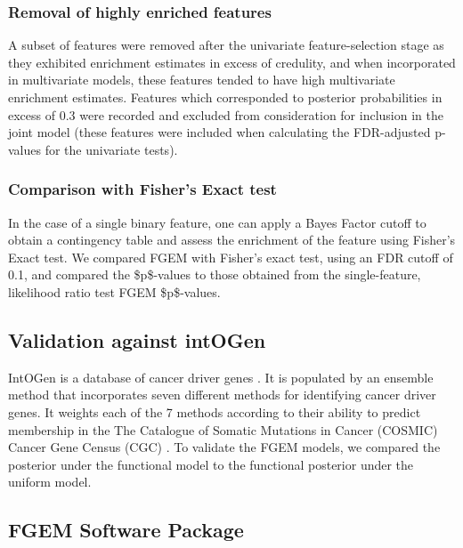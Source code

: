 \subsubsection{Removal of highly enriched features}\label{sec:org02cff25}

    A subset of features were removed after the univariate feature-selection stage as they exhibited enrichment estimates in excess of credulity, and when incorporated in multivariate models, these features tended to have high multivariate enrichment estimates. Features which corresponded to posterior probabilities in excess of 0.3 were recorded and excluded from consideration for inclusion in the joint model (these features were included when calculating the FDR-adjusted p-values for the univariate tests).  

\subsubsection{Comparison with Fisher's Exact test}\label{sec:orge6f1632}

In the case of a single binary feature, one can apply a Bayes Factor cutoff to obtain a contingency table and assess the enrichment of the feature using Fisher's Exact test.
We compared FGEM with Fisher's exact test, using an FDR cutoff of 0.1, and compared the \$p\$-values to those obtained from the single-feature, likelihood ratio test FGEM \$p\$-values.

\subsection{Validation against intOGen}\label{sec:orgd8b4e10}

IntOGen is a database of cancer driver genes \cite{gonzalez-perez13_intog_mutat_ident_cancer_driver}.  It is populated by an ensemble method that incorporates seven different methods for identifying cancer driver genes.  
It weights each of the 7 methods according to their ability to predict membership in the The Catalogue of Somatic Mutations in Cancer (COSMIC) Cancer Gene Census (CGC) \cite{COSMIC}.
To validate the FGEM models, we compared the posterior under the functional model to the functional posterior under the uniform model.


\subsection{FGEM Software Package}\label{sec:org56b3320}

